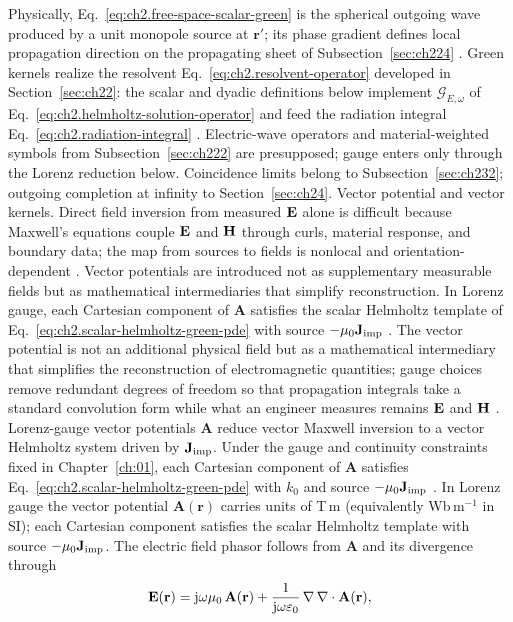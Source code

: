 Physically,
Eq.~\eqref{eq:ch2.free-space-scalar-green} is the spherical outgoing wave produced
by a unit monopole source at \(\mathbf{r}'\); its phase gradient defines local
propagation direction on the propagating sheet of Subsection~\ref{sec:ch224}
\cite{stratton1941}. Green kernels realize the resolvent
Eq.~\eqref{eq:ch2.resolvent-operator} developed in Section~\ref{sec:ch22}: the scalar and
dyadic definitions below implement $\mathcal{G}_{E,\omega}$ of
Eq.~\eqref{eq:ch2.helmholtz-solution-operator} and feed the radiation integral
Eq.~\eqref{eq:ch2.radiation-integral} \cite{stratton1941}. Electric-wave operators
and material-weighted symbols from Subsection~\ref{sec:ch222} are presupposed; gauge enters
only through the Lorenz reduction below. Coincidence limits belong to
Subsection~\ref{sec:ch232}; outgoing completion at infinity to Section~\ref{sec:ch24}.
Vector potential and vector kernels. Direct field inversion from measured $\mathbf{E}$ alone is difficult because Maxwell's equations
couple $\mathbf{E}$ and $\mathbf{H}$ through curls, material response, and boundary data; the map from
sources to fields is nonlocal and orientation-dependent \cite{stratton1941}. Vector
potentials are introduced not as supplementary measurable fields but as mathematical
intermediaries that simplify reconstruction. In Lorenz gauge,
each Cartesian component of $\mathbf{A}$ satisfies the scalar Helmholtz template of
Eq.~\eqref{eq:ch2.scalar-helmholtz-green-pde} with source $-\mu_0\mathbf{J}_{\mathrm{imp}}$
\cite{jackson1999}. The vector potential is not an
additional physical field but as a mathematical intermediary that simplifies the
reconstruction of electromagnetic quantities; gauge choices remove redundant degrees of
freedom so that propagation integrals take a standard convolution form while what an
engineer measures remains $\mathbf{E}$ and $\mathbf{H}$ \cite{stratton1941}.
Lorenz-gauge vector potentials \(\mathbf{A}\) reduce vector Maxwell inversion to a
vector Helmholtz system driven by \(\mathbf{J}_{\mathrm{imp}}\). Under the gauge and continuity constraints
fixed in Chapter~\ref{ch:01}, each Cartesian component of \(\mathbf{A}\) satisfies
Eq.~\eqref{eq:ch2.scalar-helmholtz-green-pde} with \(k_0\) and source \(-\mu_0\mathbf{J}_{\mathrm{imp}}\)
\cite{stratton1941}.
In Lorenz gauge the vector potential \(\mathbf{A}(\mathbf{r})\) carries units of
T\,m (equivalently Wb\,m\(^{-1}\) in SI); each Cartesian component satisfies the scalar
Helmholtz template with source \(-\mu_0\mathbf{J}_{\mathrm{imp}}\). The electric field phasor follows from
\(\mathbf{A}\) and its divergence through
\begin{equation}
\label{eq:ch2.lorenz-field-from-potential}
\mathbf{E}(\mathbf{r})
=
\mathrm{j}\omega\mu_0\,\mathbf{A}(\mathbf{r})
+\frac{1}{\mathrm{j}\omega\varepsilon_0}\,\nabla\,\nabla\cdot\mathbf{A}(\mathbf{r}),
\end{equation}
